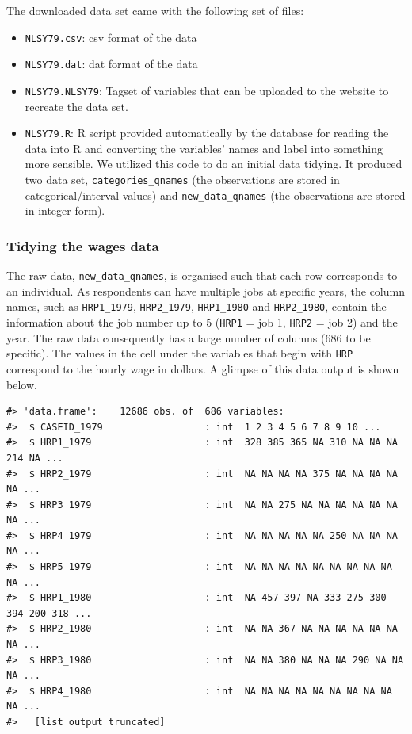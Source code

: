 \documentclass{article}
\begin{document}
The downloaded data set came with the following set of files:

\begin{itemize}
\tightlist
\item
  \texttt{NLSY79.csv}: csv format of the data
\item
  \texttt{NLSY79.dat}: dat format of the data
\item
  \texttt{NLSY79.NLSY79}: Tagset of variables that can be uploaded to the website to recreate the data set.
\item
  \texttt{NLSY79.R}: R script provided automatically by the database for reading the data into R and converting the variables' names and label into something more sensible. We utilized this code to do an initial data tidying. It produced two data set, \texttt{categories\_qnames} (the observations are stored in categorical/interval values) and \texttt{new\_data\_qnames} (the observations are stored in integer form).
\end{itemize}

\hypertarget{tidywages}{%
\subsubsection{Tidying the wages data}\label{tidywages}}

The raw data, \texttt{new\_data\_qnames}, is organised such that each row corresponds to an individual. As respondents can have multiple jobs at specific years, the column names, such as \texttt{HRP1\_1979}, \texttt{HRP2\_1979}, \texttt{HRP1\_1980} and \texttt{HRP2\_1980}, contain the information about the job number up to 5 (\texttt{HRP1} = job 1, \texttt{HRP2} = job 2) and the year. The raw data consequently has a large number of columns (686 to be specific). The values in the cell under the variables that begin with \texttt{HRP} correspond to the hourly wage in dollars. A glimpse of this data output is shown below.

\begin{verbatim}
#> 'data.frame':    12686 obs. of  686 variables:
#>  $ CASEID_1979                  : int  1 2 3 4 5 6 7 8 9 10 ...
#>  $ HRP1_1979                    : int  328 385 365 NA 310 NA NA NA 214 NA ...
#>  $ HRP2_1979                    : int  NA NA NA NA 375 NA NA NA NA NA ...
#>  $ HRP3_1979                    : int  NA NA 275 NA NA NA NA NA NA NA ...
#>  $ HRP4_1979                    : int  NA NA NA NA NA 250 NA NA NA NA ...
#>  $ HRP5_1979                    : int  NA NA NA NA NA NA NA NA NA NA ...
#>  $ HRP1_1980                    : int  NA 457 397 NA 333 275 300 394 200 318 ...
#>  $ HRP2_1980                    : int  NA NA 367 NA NA NA NA NA NA NA ...
#>  $ HRP3_1980                    : int  NA NA 380 NA NA NA 290 NA NA NA ...
#>  $ HRP4_1980                    : int  NA NA NA NA NA NA NA NA NA NA ...
#>   [list output truncated]
\end{verbatim}
\end{document}
